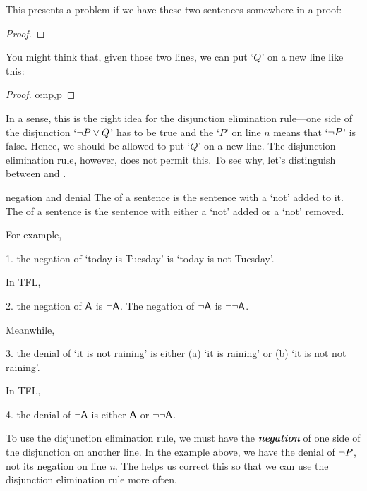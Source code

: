 This presents a problem if we have these two sentences somewhere in a proof:
\begin{proof}
\end{proof}
You might think that, given those two lines, we can put `$Q$' on a new line like this:
\begin{proof}
	 \oe{np,p}
\end{proof}
In a sense, this is the right idea for the disjunction elimination rule---one side of the disjunction `${\neg} P \vee Q$' has to be true and the `$P$' on line $n$ means that `${\neg} P$' is false. Hence, we should be allowed to put `$Q$' on a new line. The disjunction elimination rule, however, does not permit this. To see why, let's distinguish between  and .

\begin{factboxy}{negation and denial}
The  of a sentence is the sentence with a `not' added to it.\\ 
The  of a sentence is the sentence with either a `not' added or a `not' removed.
\end{factboxy}

\noindent For example, 
\begin{earg}
\item[1.] the negation of `today is Tuesday' is `today is not Tuesday'. 
\end{earg}
In TFL, 
\begin{earg}
\item[2.] the negation of $\mathsf{A}$ is ${\neg}\mathsf{A}$. The negation of ${\neg}\mathsf{A}$ is ${\neg}{\neg}\mathsf{A}$.
\end{earg}
Meanwhile,
\begin{earg}
\item[3.] the denial of `it is not raining' is either (a) `it is raining' or (b) `it is not not raining'. 
\end{earg}
In TFL,
\begin{earg}
\item[4.] the denial of ${\neg}\mathsf{A}$ is either $\mathsf{A}$ or ${\neg}{\neg}\mathsf{A}$.
\end{earg}
To use the disjunction elimination rule, we must have the \textbf{\textit{negation}} of one side of the disjunction on another line. In the example above, we have the denial of ${\neg} P$, not its negation on line \textit{n}. The  helps us correct this so that we can use the disjunction elimination rule more often. 

